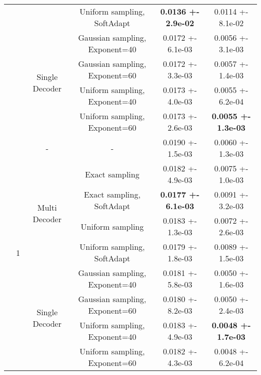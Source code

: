 \begin{tabular}{||c|c|c|c|c|c||}
\cline{4-6}
 &  &  & Uniform sampling, SoftAdapt & \textbf{0.0136 +- 2.9e-02} & 0.0114 +- 8.1e-02 \\
\cline{4-6}
\cline{3-6}
 &  & \multirow{4}{*}{Single Decoder} & Gaussian sampling, Exponent=40 & 0.0172 +- 6.1e-03 & 0.0056 +- 3.1e-03 \\
\cline{4-6}
 &  &  & Gaussian sampling, Exponent=60 & 0.0172 +- 3.3e-03 & 0.0057 +- 1.4e-03 \\
\cline{4-6}
 &  &  & Uniform sampling, Exponent=40 & 0.0173 +- 4.0e-03 & 0.0055 +- 6.2e-04 \\
\cline{4-6}
 &  &  & Uniform sampling, Exponent=60 & 0.0173 +- 2.6e-03 & \textbf{0.0055 +- 1.3e-03} \\
\cline{4-6}
\cline{3-6}
\cline{2-6}
 & \multirow{9}{*}{1} & \multirow{1}{*}{-} & - & 0.0190 +- 1.5e-03 & 0.0060 +- 1.3e-03 \\
\cline{4-6}
\cline{3-6}
 &  & \multirow{4}{*}{Multi Decoder} & Exact sampling & 0.0182 +- 4.9e-03 & 0.0075 +- 1.0e-03 \\
\cline{4-6}
 &  &  & Exact sampling, SoftAdapt & \textbf{0.0177 +- 6.1e-03} & 0.0091 +- 3.2e-03 \\
\cline{4-6}
 &  &  & Uniform sampling & 0.0183 +- 1.3e-03 & 0.0072 +- 2.6e-03 \\
\cline{4-6}
 &  &  & Uniform sampling, SoftAdapt & 0.0179 +- 1.8e-03 & 0.0089 +- 1.5e-03 \\
\cline{4-6}
\cline{3-6}
 &  & \multirow{4}{*}{Single Decoder} & Gaussian sampling, Exponent=40 & 0.0181 +- 5.8e-03 & 0.0050 +- 1.6e-03 \\
\cline{4-6}
 &  &  & Gaussian sampling, Exponent=60 & 0.0180 +- 8.2e-03 & 0.0050 +- 2.4e-03 \\
\cline{4-6}
 &  &  & Uniform sampling, Exponent=40 & 0.0183 +- 4.9e-03 & \textbf{0.0048 +- 1.7e-03} \\
\cline{4-6}
 &  &  & Uniform sampling, Exponent=60 & 0.0182 +- 4.3e-03 & 0.0048 +- 6.2e-04 \\
\cline{4-6}
\cline{3-6}
\cline{2-6}
\hline
\hline
\end{tabular}
